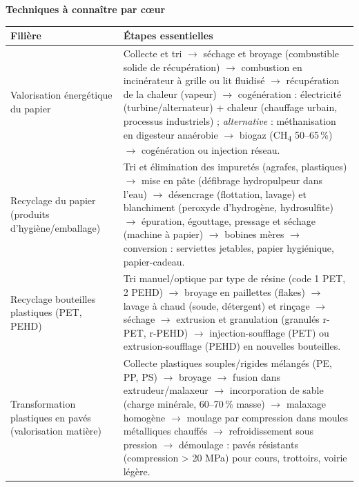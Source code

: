 \documentclass[11pt]{article}
\begin{document}
\begin{aretenir}
\textbf{Techniques à connaître par cœur}
\begin{center}
\begin{tabularx}{\linewidth}{|l|X|}
\hline
\rowcolor{popblueL} \textbf{Filière} & \textbf{Étapes essentielles} \\
\hline
Valorisation énergétique du papier & Collecte et tri $\rightarrow$ séchage et broyage (combustible solide de récupération) $\rightarrow$ combustion en incinérateur à grille ou lit fluidisé $\rightarrow$ récupération de la chaleur (vapeur) $\rightarrow$ cogénération : électricité (turbine/alternateur) + chaleur (chauffage urbain, processus industriels) ; \emph{alternative} : méthanisation en digesteur anaérobie $\rightarrow$ biogaz (CH\textsubscript{4} 50--65\,\%) $\rightarrow$ cogénération ou injection réseau. \\
\hline
Recyclage du papier (produits d'hygiène/emballage) & Tri et élimination des impuretés (agrafes, plastiques) $\rightarrow$ mise en pâte (défibrage hydropulpeur dans l'eau) $\rightarrow$ désencrage (flottation, lavage) et blanchiment (peroxyde d'hydrogène, hydrosulfite) $\rightarrow$ épuration, égouttage, pressage et séchage (machine à papier) $\rightarrow$ bobines mères $\rightarrow$ conversion : serviettes jetables, papier hygiénique, papier-cadeau. \\
\hline
Recyclage bouteilles plastiques (PET, PEHD) & Tri manuel/optique par type de résine (code 1 PET, 2 PEHD) $\rightarrow$ broyage en paillettes (flakes) $\rightarrow$ lavage à chaud (soude, détergent) et rinçage $\rightarrow$ séchage $\rightarrow$ extrusion et granulation (granulés r-PET, r-PEHD) $\rightarrow$ injection-soufflage (PET) ou extrusion-soufflage (PEHD) en nouvelles bouteilles. \\
\hline
Transformation plastiques en pavés (valorisation matière) & Collecte plastiques souples/rigides mélangés (PE, PP, PS) $\rightarrow$ broyage $\rightarrow$ fusion dans extrudeur/malaxeur $\rightarrow$ incorporation de sable (charge minérale, 60--70\,\% masse) $\rightarrow$ malaxage homogène $\rightarrow$ moulage par compression dans moules métalliques chauffés $\rightarrow$ refroidissement sous pression $\rightarrow$ démoulage : pavés résistants (compression > 20 MPa) pour cours, trottoirs, voirie légère. \\
\hline
\end{tabularx}
\end{center}


\end{aretenir}
\end{document}
